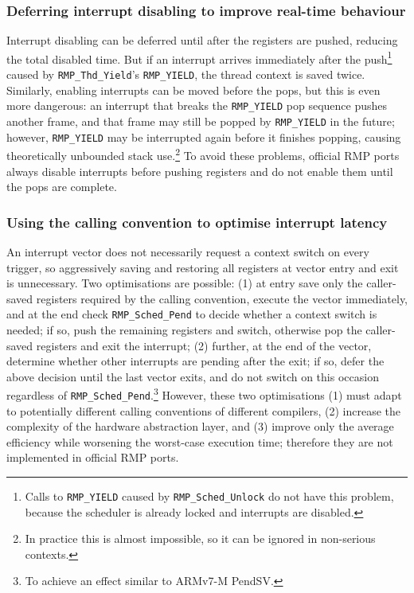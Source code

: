 \subsubsection{Deferring interrupt disabling to improve real-time behaviour}

Interrupt disabling can be deferred until after the registers are pushed, reducing the total disabled time.
But if an interrupt arrives immediately after the push\footnote{Calls to \texttt{RMP\_YIELD} caused by \texttt{RMP\_Sched\_Unlock} do not have this problem, because the scheduler is already locked and interrupts are disabled.} caused by \texttt{RMP\_Thd\_Yield}'s \texttt{RMP\_YIELD}, the thread context is saved twice.
Similarly, enabling interrupts can be moved before the pops, but this is even more dangerous: an interrupt that breaks the \texttt{RMP\_YIELD} pop sequence pushes another frame, and that frame may still be popped by \texttt{RMP\_YIELD} in the future; however, \texttt{RMP\_YIELD} may be interrupted again before it finishes popping, causing theoretically unbounded stack use.\footnote{In practice this is almost impossible, so it can be ignored in non-serious contexts.}
To avoid these problems, official RMP ports always disable interrupts before pushing registers and do not enable them until the pops are complete.

\subsubsection{Using the calling convention to optimise interrupt latency}

An interrupt vector does not necessarily request a context switch on every trigger, so aggressively saving and restoring all registers at vector entry and exit is unnecessary.
Two optimisations are possible: (1) at entry save only the caller-saved registers required by the calling convention, execute the vector immediately, and at the end check \texttt{RMP\_Sched\_Pend} to decide whether a context switch is needed; if so, push the remaining registers and switch, otherwise pop the caller-saved registers and exit the interrupt; (2) further, at the end of the vector, determine whether other interrupts are pending after the exit; if so, defer the above decision until the last vector exits, and do not switch on this occasion regardless of \texttt{RMP\_Sched\_Pend}.\footnote{To achieve an effect similar to ARMv7-M PendSV.}
However, these two optimisations (1) must adapt to potentially different calling conventions of different compilers, (2) increase the complexity of the hardware abstraction layer, and (3) improve only the average efficiency while worsening the worst-case execution time; therefore they are not implemented in official RMP ports.


